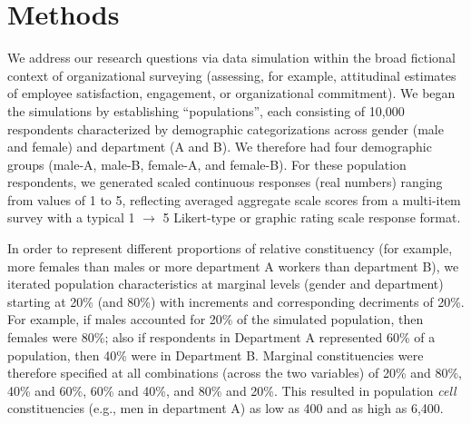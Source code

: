 \documentclass[
  man,floatsintext]{apa7}
\begin{document}
\hypertarget{methods}{%
\section{Methods}\label{methods}}

We address our research questions via data simulation within the broad fictional context of organizational surveying (assessing, for example, attitudinal estimates of employee satisfaction, engagement, or organizational commitment). We began the simulations by establishing ``populations'', each consisting of 10,000 respondents characterized by demographic categorizations across gender (male and female) and department (A and B). We therefore had four demographic groups (male-A, male-B, female-A, and female-B). For these population respondents, we generated scaled continuous responses (real numbers) ranging from values of 1 to 5, reflecting averaged aggregate scale scores from a multi-item survey with a typical 1 \(\rightarrow\) 5 Likert-type or graphic rating scale response format.

In order to represent different proportions of relative constituency (for example, more females than males or more department A workers than department B), we iterated population characteristics at marginal levels (gender and department) starting at 20\% (and 80\%) with increments and corresponding decriments of 20\%. For example, if males accounted for 20\% of the simulated population, then females were 80\%; also if respondents in Department A represented 60\% of a population, then 40\% were in Department B. Marginal constituencies were therefore specified at all combinations (across the two variables) of 20\% and 80\%, 40\% and 60\%, 60\% and 40\%, and 80\% and 20\%. This resulted in population \emph{cell} constituencies (e.g., men in department A) as low as 400 and as high as 6,400.
\end{document}
